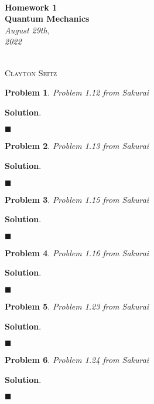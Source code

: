 \documentclass[12pt]{article}
\newtheorem{p}{Problem}
\theoremstyle{definition}
\newenvironment{s}{%
        \begin{trivlist} \item \textbf{Solution}. }{%
            \hspace*{\fill} $\blacksquare$\end{trivlist}}%
\begin{document}
{\noindent\Huge\bf  \\[0.5\baselineskip] {\selectfont  Homework 1}         }\\[2\baselineskip] %
{ {\bf {}\selectfont Quantum Mechanics}\\ {\textit{\selectfont     August 29th, 2022}}}~~~~~~~~~~~~~~~~~~~~~~~~~~~~~~~~~~~~~~~~~~~~~~~~~~~~~~~~~~~~~~~~~~~~~~~~~~~~~    {\large \textsc{Clayton Seitz}
\\[1.4\baselineskip] 

\begin{p}
Problem 1.12 from Sakurai
\end{p}

\begin{s} 

\end{s}

\begin{p}
Problem 1.13 from Sakurai
\end{p}

\begin{s} 

\end{s}

\begin{p}
Problem 1.15 from Sakurai
\end{p}

\begin{s} 

\end{s}

\begin{p}
Problem 1.16 from Sakurai
\end{p}

\begin{s} 

\end{s}

\begin{p}
Problem 1.23 from Sakurai
\end{p}

\begin{s} 

\end{s}

\begin{p}
Problem 1.24 from Sakurai
\end{p}

\begin{s} 

\end{s}
\end{document}

